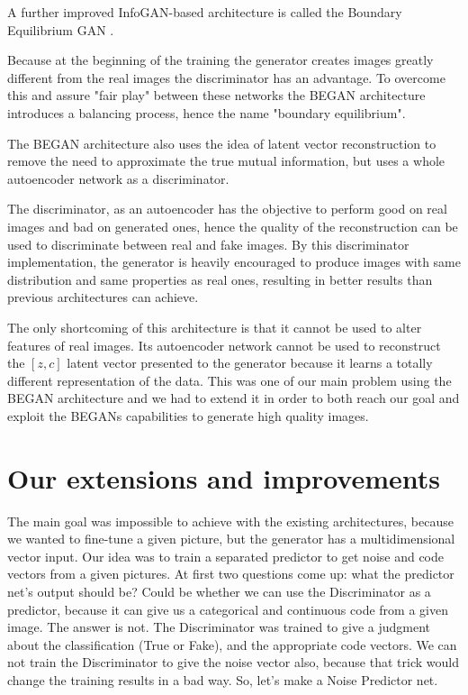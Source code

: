 \documentclass[10pt,journal,compsoc]{IEEEtran}
\begin{document}
A further improved InfoGAN-based architecture is called the Boundary Equilibrium GAN \cite{berthelot2017began}.

Because at the beginning of the training the generator creates images greatly different from the real images the discriminator has an advantage. To overcome this and assure "fair play" between these networks the BEGAN architecture introduces a balancing process, hence the name "boundary equilibrium".

The BEGAN architecture also uses the idea of latent vector reconstruction to remove the need to approximate the true mutual information, but uses a whole autoencoder network as a discriminator.

The discriminator, as an autoencoder has the objective to perform good on real images and bad on generated ones, hence the quality of the reconstruction can be used to discriminate between real and fake images. By this discriminator implementation, the generator is heavily encouraged to produce images with same distribution and same properties as real ones, resulting in better results than previous architectures can achieve.

The only shortcoming of this architecture is that it cannot be used to alter features of real images. Its autoencoder network cannot be used to reconstruct the $[z,c]$ latent vector presented to the generator because it learns a totally different representation of the data. This was one of our main problem using the BEGAN architecture and we had to extend it in order to both reach our goal and exploit the BEGANs capabilities to generate high quality images.

\section{Our extensions and improvements}
The main goal was impossible to achieve with the existing architectures, because we wanted to fine-tune a given picture, but the generator has a multidimensional vector input. Our idea was to train a separated predictor to get noise and code vectors from a given pictures.  At first two questions come up: what the predictor net’s output should be? Could be whether we can use the Discriminator as a predictor, because it can give us a categorical and continuous code from a given image. The answer is not. The Discriminator was trained to give a judgment about the classification (True or Fake), and the appropriate code vectors. We can not train the Discriminator to give the noise vector also, because that trick would change the training results in a bad way. So, let’s make a Noise Predictor net.
\end{document}
